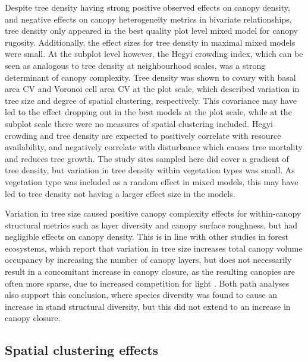 \begin{refsection}
Despite tree density having strong positive observed effects on canopy density, and negative effects on canopy heterogeneity metrics in bivariate relationships, tree density only appeared in the best quality plot level mixed model for canopy rugosity. Additionally, the effect sizes for tree density in maximal mixed models were small. At the subplot level however, the Hegyi crowding index, which can be seen as analogous to tree density at neighbourhood scales, was a strong determinant of canopy complexity. Tree density was shown to covary with basal area CV and Voronoi cell area CV at the plot scale, which described variation in tree size and degree of spatial clustering, respectively. This covariance may have led to the effect dropping out in the best models at the plot scale, while at the subplot scale there were no measures of spatial clustering included. Hegyi crowding and tree density are expected to positively correlate with resource availability, and negatively correlate with disturbance which causes tree mortality and reduces tree growth. The study sites sampled here did cover a gradient of tree density, but variation in tree density within vegetation types was small. As vegetation type was included as a random effect in mixed models, this may have led to tree density not having a larger effect size in the models.

Variation in tree size caused positive canopy complexity effects for within-canopy structural metrics such as layer diversity and canopy surface roughness, but had negligible effects on canopy density. This is in line with other studies in forest ecosystems, which report that variation in tree size increases total canopy volume occupancy by increasing the number of canopy layers, but does not necessarily result in a concomitant increase in canopy closure, as the resulting canopies are often more sparse, due to increased competition for light \citep{Beland2021a}. Both path analyses also support this conclusion, where species diversity was found to cause an increase in stand structural diversity, but this did not extend to an increase in canopy closure. 

\subsection{Spatial clustering effects}
\label{tls:ssec:clustering}


\end{refsection}
